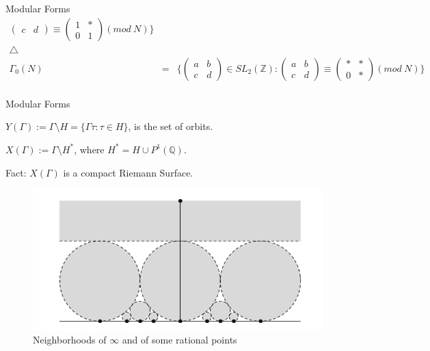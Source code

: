 \documentclass{beamer}
\theoremstyle{plain}
\theoremstyle{definition}
\theoremstyle{remark}
\newcommand{\Q}{\mathbb{Q}}
\newcommand{\Z}{\mathbb{Z}}
\begin{document}
\begin{frame}{Modular Forms}
\[\begin{matrix}
\begin{pmatrix}
                c & d
            \end{pmatrix} \equiv \begin{pmatrix}
                1 & * \\
                0 & 1
            \end{pmatrix} (mod \ N)   \} \\
            \bigtriangleup &   &                                                                                                                       \\
            \Gamma_0(N)    & = & \{ \begin{pmatrix}
                a & b \\
                c & d
            \end{pmatrix}\in SL_2(\Z): \begin{pmatrix}
                a & b \\
                c & d
            \end{pmatrix} \equiv \begin{pmatrix}
                * & * \\
                0 & *
            \end{pmatrix} (mod \ N)  \} \\
        \end{matrix}\]
\end{frame}

\begin{frame}{Modular Forms}
    \begin{definition}
        $Y(\Gamma):=\Gamma \setminus H=\{\Gamma \tau : \tau \in H \}$, is the set of orbits.

        $X(\Gamma):=\Gamma \setminus H^*$, where $H^*=H \cup P^1(\Q)$.
    \end{definition}
    Fact: $X(\Gamma)$ is a compact Riemann Surface.
    \begin{figure}
        \centering
        \includegraphics[scale=0.30]{fig2.5.png}
        \caption{Neighborhoods of $\infty$ and of some rational points}
    \end{figure}
\end{frame}
\end{document}
